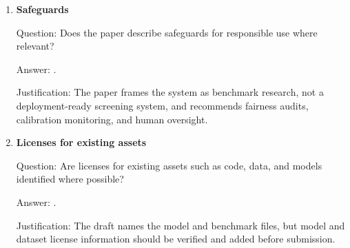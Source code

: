 \begin{enumerate}
Justification: Section 9 discusses deployment risks, fairness concerns, prestige
proxies, and the need for human oversight in VC screening.

\item \textbf{Safeguards}

Question: Does the paper describe safeguards for responsible use where relevant?

Answer: \answerYes{}.

Justification: The paper frames the system as benchmark research, not a
deployment-ready screening system, and recommends fairness audits, calibration
monitoring, and human oversight.

\item \textbf{Licenses for existing assets}

Question: Are licenses for existing assets such as code, data, and models
identified where possible?

Answer: \answerNo{}.

Justification: The draft names the model and benchmark files, but model and
dataset license information should be verified and added before submission.
\end{enumerate}
